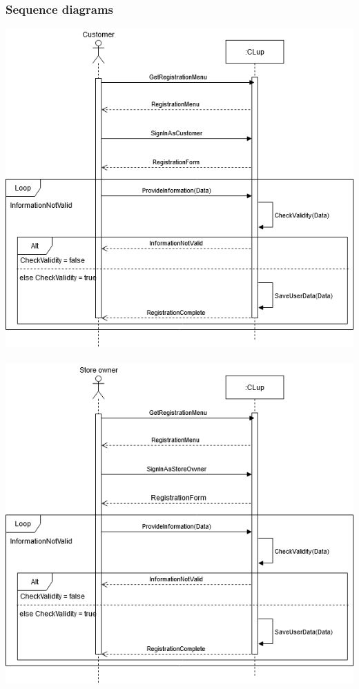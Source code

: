 \subsubsection{Sequence diagrams}
\includegraphics[scale=0.5]{Images/UseCase1Diagram.png}\\\\
\includegraphics[scale=0.5]{Images/UseCase2Diagram.png}\\\\
